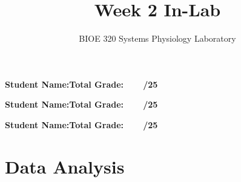 \documentclass{article}
\title{Week 2 In-Lab}
\author{BIOE 320 Systems Physiology Laboratory}
\date{}
\begin{document}
\large
\maketitle

\textbf{Student Name:}\hfill 	\textbf{Total Grade:\ \ \ \ /25}\vspace{0.5cm}

\textbf{Student Name:}\hfill 	\textbf{Total Grade:\ \ \ \ /25}\vspace{0.5cm}

\textbf{Student Name:}\hfill 	\textbf{Total Grade:\ \ \ \ /25}\\

\section*{Data Analysis}
\end{document}
